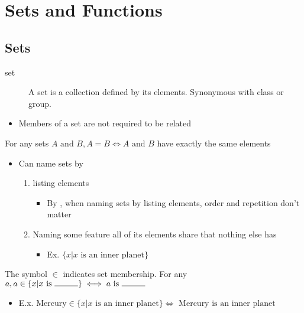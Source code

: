 \section{Sets and Functions}
\subsection{Sets}
\begin{description}
	\item[set] A set is a collection defined by its elements. Synonymous with class or group.
\end{description}
\begin{itemize}
	\item Members of a set are not required to be related
\end{itemize}

\begin{axiom}
	For any sets $A \text{ and } B, A=B \iff A \text{ and } B$ have exactly the same
	elements
	\label{axiom:AoE}
\end{axiom}

\begin{itemize}
	\item Can name sets by
	      \begin{enumerate}
		      \item listing elements
		            \begin{itemize}
			            \item By , when naming sets by listing elements, order and
			                  repetition don't matter
		            \end{itemize}
		      \item Naming some feature all of its elements share that nothing
		            else has
		            \begin{itemize}
			            \item Ex. $\{x| x \text{ is an inner planet}\}$
		            \end{itemize}
	      \end{enumerate}
\end{itemize}

\begin{definition}
	The symbol $\in$ indicates set membership. For any $a,a \in \{x| x \text{ is }
		\rule{1cm}{0.15mm}\} \iff a \text{ is } \rule{1cm}{0.15mm}$
	\begin{itemize}
		\item E.x. $\text{Mercury} \in \{x | x \text{ is an inner planet} \}
			      \iff \text{ Mercury is an inner planet}$
	\end{itemize}
\end{definition}

